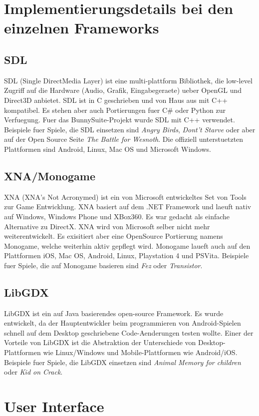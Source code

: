 \section{Implementierungsdetails bei den einzelnen Frameworks}
\subsection{SDL}
SDL (Single DirectMedia Layer) ist eine multi-plattform Bibliothek, die low-level Zugriff auf die Hardware (Audio, Grafik, Eingabegeraete) ueber OpenGL und Direct3D anbietet. SDL ist in C geschrieben und von Haus aus mit C++ kompatibel. Es stehen aber auch Portierungen fuer C\# oder Python zur Verfuegung. Fuer das BunnySuite-Projekt wurde SDL mit C++ verwendet. Beispiele fuer Spiele, die SDL einsetzen sind \emph{Angry Birds}, \emph{Dont't Starve} oder aber auf der Open Source Seite \emph{The Battle for Wesnoth}. Die offiziell unterstuetzten Plattformen sind Android, Linux, Mac OS und Microsoft Windows.

\subsection{XNA/Monogame}
XNA (XNA's Not Acronymed) ist ein von Microsoft entwickeltes Set von Tools zur Game Entwicklung. XNA basiert auf dem .NET Framework und laeuft nativ auf Windows, Windows Phone und XBox360. Es war gedacht als einfache Alternative zu DirectX. XNA wird von Microsoft selber nicht mehr weiterentwickelt. Es exisitiert aber eine OpenSource Portierung namens Monogame, welche weiterhin aktiv gepflegt wird. Monogame laueft auch auf den Plattformen iOS, Mac OS, Android, Linux, Playstation 4 und PSVita. Beispiele fuer Spiele, die auf Monogame basieren sind \emph{Fez} oder \emph{Transistor}.

\subsection{LibGDX}
LibGDX ist ein auf Java basierendes open-source Framework. Es wurde entwickelt, da der Hauptentwickler beim programmieren von Android-Spielen schnell auf dem Desktop geschriebene Code-Aenderungen testen wollte. Einer der Vorteile von LibGDX ist die Abstraktion der Unterschiede von Desktop-Plattformen wie Linux/Windows und Mobile-Plattformen wie Android/iOS. Beispiele fuer Spiele, die LibGDX einsetzen sind \emph{Animal Memory for children} oder \emph{Kid on Crack}.

\section{User Interface}
